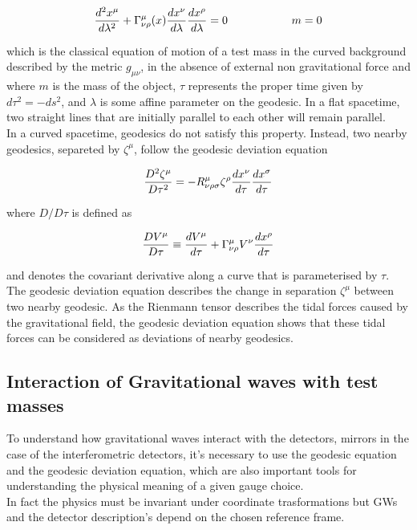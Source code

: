 \documentclass[binding=0.6cm, LaM]{sapthesis}
\begin{document}
		\begin{equation}
		{{d^2x^{\mu}}\over{d\lambda^2}} + \Gamma_{\nu\rho}^{\mu}(x){{dx^{\nu}}\over{d\lambda}}{{dx^{\rho}}\over{d\lambda}} = 0 \hspace*{2cm} m = 0
		\end{equation}

	which is the classical equation of motion of a test mass in the curved background described 
	by the metric $g_{\mu\nu}$, in the absence of external non gravitational force and where $m$ is the mass
	of the object, $\tau$ represents the proper time given by $d\tau^2 = -ds^2$, 
	and $\lambda$ is some affine parameter on the geodesic.
	In a flat spacetime, two straight lines that are initially parallel to each other will remain parallel. \\
	In a curved spacetime, geodesics do not satisfy this property.
	Instead, two nearby geodesics, separeted by $\zeta^{\mu}$, follow the geodesic deviation equation
		
		\begin{equation}
		{{D^2\zeta^{\mu}}\over{D\tau^2}} = -R^{\mu}_{\nu\rho\sigma}\zeta^{\rho}{{dx^{\nu}}\over{d\tau}}{{dx^{\sigma}}\over{d\tau}}
		\end{equation}

	where $D/D\tau$ is defined as

		\begin{equation}
		{{DV^{\mu}}\over{D\tau}} \equiv {{dV^{\mu}}\over{d\tau}} + \Gamma^{\mu}_{\nu\rho}V^{\nu}{{dx^{\rho}}\over{d\tau}}
		\end{equation}

	and denotes the covariant derivative along a curve that is parameterised by $\tau$. 
	The geodesic deviation equation describes the change in separation $\zeta^{\mu}$ between two nearby geodesic.
	As the Rienmann tensor describes the tidal forces caused by the gravitational field, 
	the geodesic deviation equation shows that these tidal forces can be considered as deviations of nearby geodesics.

\subsection{Interaction of Gravitational waves with test masses}

	To understand how gravitational waves interact with the detectors, mirrors in the case of the interferometric detectors, 
	it's necessary to use the geodesic equation and the geodesic deviation equation, which are also important tools 
	for understanding the physical meaning of a given gauge choice. \\
	In fact the physics must be invariant under coordinate trasformations but GWs and the detector description's depend on the chosen reference frame.
\end{document}
